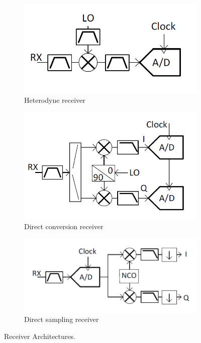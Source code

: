 \documentclass[12pt,a4paper]{report}
\begin{document}
\begin{figure}[h]
\centering
    \begin{subfigure}{0.45\textwidth}
        \centering
        \includegraphics[scale = 1.1]{Figures/SDR_HET.png}
        \caption{Heterodyne receiver}
    \end{subfigure}
    \begin{subfigure}{0.45\textwidth}
        \centering
        \includegraphics[scale = 1]{Figures/SDR_ZIF.png}
        \caption{Direct conversion receiver}
    \end{subfigure}
    \newline
    \begin{subfigure}{\textwidth}
        \centering
        \includegraphics[scale = 1]{Figures/SDR_DS.png}
        \caption{Direct sampling receiver}
    \end{subfigure}
    \caption[Receiver architectures.]{Receiver Architectures. \cite{ad9361}}
    \label{fig:receiver_architectures}
\end{figure}
\end{document}
